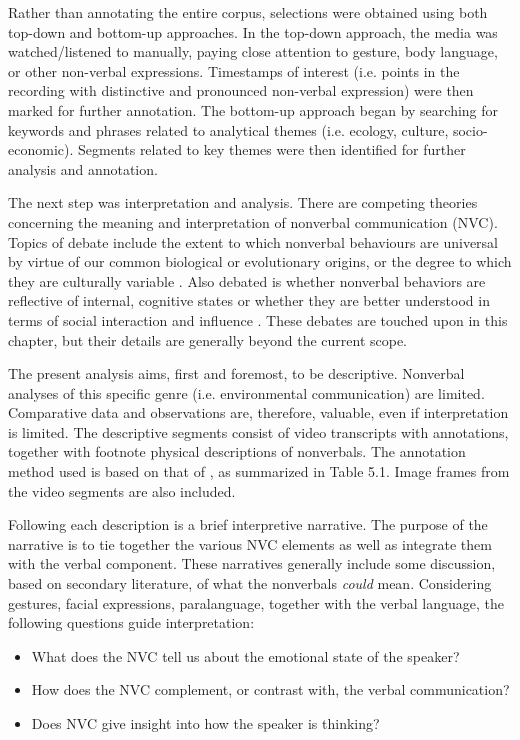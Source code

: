 Rather than annotating the entire corpus, selections were obtained using both top-down and bottom-up approaches. In the top-down approach, the media was watched/listened to manually, paying close attention to gesture, body language, or other non-verbal expressions. Timestamps of interest (i.e. points in the recording with distinctive and pronounced non-verbal expression) were then marked for further annotation. The bottom-up approach began by searching for keywords and phrases related to analytical themes (i.e. ecology, culture, socio-economic). Segments related to key themes were then identified for further analysis and annotation. 

The next step was interpretation and analysis. There are competing theories concerning the meaning and interpretation of nonverbal communication (NVC). Topics of debate include the extent to which nonverbal behaviours are universal by virtue of our common biological or evolutionary origins, or the degree to which they are culturally variable \citep[e.g.][]{Jack2012}. Also debated is whether nonverbal behaviors are reflective of internal, cognitive states or whether they are better understood in terms of social interaction and influence \citep[e.g.][]{Crivelli2018}. These debates are touched upon in this chapter, but their details are generally beyond the current scope.

The present analysis aims, first and foremost, to be descriptive. Nonverbal analyses of this specific genre (i.e. environmental communication) are limited. Comparative data and observations are, therefore, valuable, even if interpretation is limited. The descriptive segments consist of video transcripts with annotations, together with footnote physical descriptions of nonverbals. The annotation method used is based on that of \cite{Jefferson2004}, as summarized in Table 5.1. Image frames from the video segments are also included.

Following each description is a brief interpretive narrative. The purpose of the narrative is to tie together the various NVC elements as well as integrate them with the verbal component. These narratives generally include some discussion, based on secondary literature, of what the nonverbals \textit{could} mean. Considering gestures, facial expressions, paralanguage, together with the verbal language, the following questions guide interpretation:

\begin{itemize}
\item What does the NVC tell us about the emotional state of the speaker?
\item How does the NVC complement, or contrast with, the verbal communication?
\item Does NVC give insight into how the speaker is thinking?
\end{itemize}

